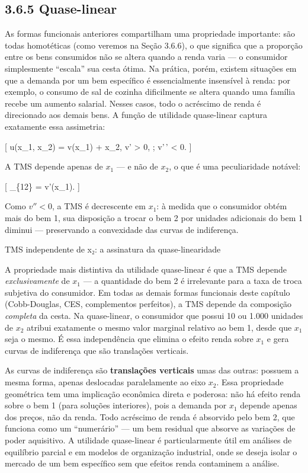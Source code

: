 \documentclass[11pt,twoside,openright]{book}
\begin{document}
\subsection{3.6.5 Quase-linear}\label{quase-linear}

As formas funcionais anteriores compartilham uma propriedade importante:
são todas homotéticas (como veremos na Seção 3.6.6), o que significa que
a proporção entre os bens consumidos não se altera quando a renda varia
--- o consumidor simplesmente ``escala'' sua cesta ótima. Na prática,
porém, existem situações em que a demanda por um bem específico é
essencialmente insensível à renda: por exemplo, o consumo de sal de
cozinha dificilmente se altera quando uma família recebe um aumento
salarial. Nesses casos, todo o acréscimo de renda é direcionado aos
demais bens. A função de utilidade quase-linear captura exatamente essa
assimetria:

{[} u(x\_1, x\_2) = v(x\_1) + x\_2, \quad v' \textgreater{} 0, ; v'\,'
\textless{} 0. \label{eq:3.6.13}  {]}

A TMS depende apenas de \(x_1\) --- e não de \(x_2\), o que é uma
peculiaridade notável:

{[} \_\{12\} = v'(x\_1). \label{eq:3.6.14}  {]}

Como \(v'' < 0\), a TMS é decrescente em \(x_1\): à medida que o
consumidor obtém mais do bem 1, sua disposição a trocar o bem 2 por
unidades adicionais do bem 1 diminui --- preservando a convexidade das
curvas de indiferença.

\begin{notebox}{TMS independente de x₂: a assinatura da quase-linearidade}

A propriedade mais distintiva da utilidade quase-linear é que a TMS
depende \emph{exclusivamente} de \(x_1\) --- a quantidade do bem 2 é
irrelevante para a taxa de troca subjetiva do consumidor. Em todas as
demais formas funcionais deste capítulo (Cobb-Douglas, CES, complementos
perfeitos), a TMS depende da composição \emph{completa} da cesta. Na
quase-linear, o consumidor que possui 10 ou 1.000 unidades de \(x_2\)
atribui exatamente o mesmo valor marginal relativo ao bem 1, desde que
\(x_1\) seja o mesmo. É essa independência que elimina o efeito renda
sobre \(x_1\) e gera curvas de indiferença que são translações
verticais.

\end{notebox}

As curvas de indiferença são \textbf{translações verticais} umas das
outras: possuem a mesma forma, apenas deslocadas paralelamente ao eixo
\(x_2\). Essa propriedade geométrica tem uma implicação econômica direta
e poderosa: não há efeito renda sobre o bem 1 (para soluções
interiores), pois a demanda por \(x_1\) depende apenas dos preços, não
da renda. Todo acréscimo de renda é absorvido pelo bem 2, que funciona
como um ``numerário'' --- um bem residual que absorve as variações de
poder aquisitivo. A utilidade quase-linear é particularmente útil em
análises de equilíbrio parcial e em modelos de organização industrial,
onde se deseja isolar o mercado de um bem específico sem que efeitos
renda contaminem a análise.
\end{document}
